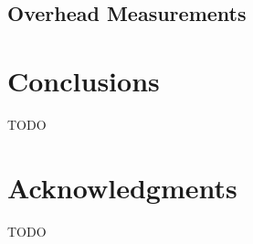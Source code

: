 \documentclass{acm_proc_article-sp}
\begin{document}
\subsection{Overhead Measurements}

\section{Conclusions}
TODO

\section{Acknowledgments}
TODO
%


%
%
\balancecolumns
\end{document}
